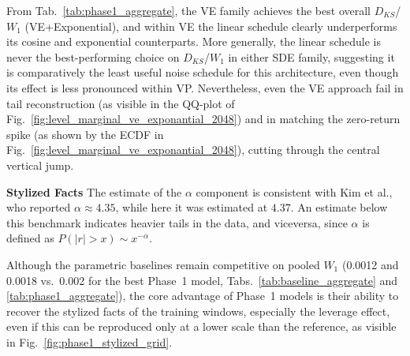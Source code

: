 From Tab.\ \ref{tab:phase1_aggregate}, the VE family achieves the best overall \(D_{KS}\)/\(W_1\) (VE+Exponential), and within VE the linear schedule clearly underperforms its cosine and exponential counterparts. More generally, the linear schedule is never the best-performing choice on \(D_{KS}\)/\(W_1\) in either SDE family, suggesting it is comparatively the least useful noise schedule for this architecture, even though its effect is less pronounced within VP. Nevertheless, even the VE approach fail in tail reconstruction (as visible in the QQ-plot of Fig.\ \ref{fig:level_marginal_ve_exponantial_2048}) and in matching the zero-return spike (as shown by the ECDF in Fig.\ \ref{fig:level_marginal_ve_exponantial_2048}), cutting through the central vertical jump.

\textbf{Stylized Facts} \quad The estimate of the \(\alpha\) component is consistent with Kim et al., who reported \(\alpha\approx4.35\), while here it was estimated at \(4.37\). An estimate below this benchmark indicates heavier tails in the data, and viceversa, since \(\alpha\) is defined as $P(|r|>x)\sim x^{-\alpha}$.

Although the parametric baselines remain competitive on pooled \(W_1\) (0.0012 and 0.0018 vs.\ 0.002 for the best Phase~1 model, Tabs.\ \ref{tab:baseline_aggregate} and \ref{tab:phase1_aggregate}), the core advantage of Phase~1 models is their ability to recover the stylized facts of the training windows, especially the leverage effect, even if this can be reproduced only at a lower scale than the reference, as visible in Fig.\ \ref{fig:phase1_stylized_grid}.

